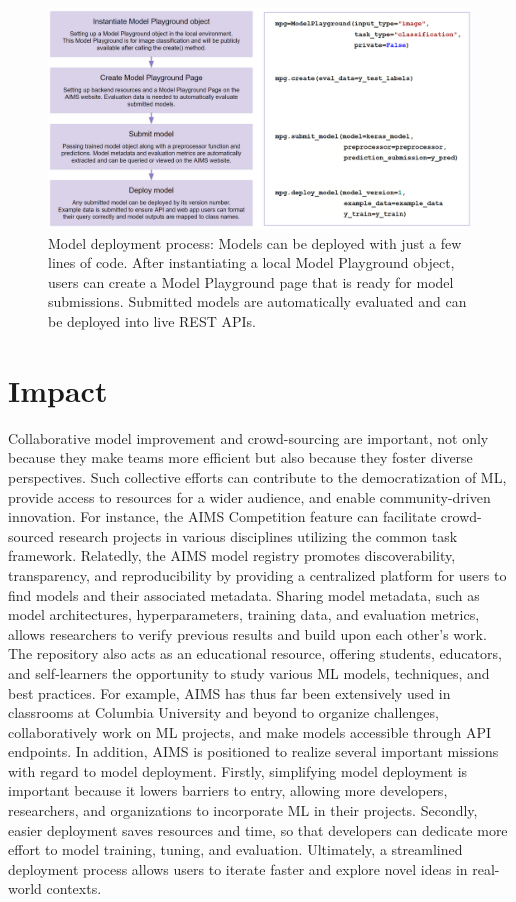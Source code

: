 \begin{figure}
  \centering
  \includegraphics[width=1\textwidth]{figures/fig_aims_code_new.png}
  \caption{Model deployment process: Models can be deployed with just a few lines of code. After instantiating a local Model Playground object, users can create a Model Playground page that is ready for model submissions. Submitted models are automatically evaluated and can be deployed into live REST APIs.}
  \label{fig:fig_code_example}
\end{figure}

\section{Impact}
Collaborative model improvement and crowd-sourcing are important, not only because they make teams more efficient but also because they foster diverse perspectives. Such collective efforts can contribute to the democratization of ML, provide access to resources for a wider audience, and enable community-driven innovation. For instance, the AIMS Competition feature can facilitate crowd-sourced research projects in various disciplines utilizing the common task framework. Relatedly, the AIMS model registry promotes discoverability, transparency, and reproducibility by providing a centralized platform for users to find models and their associated metadata. Sharing model metadata, such as model architectures, hyperparameters, training data, and evaluation metrics, allows researchers to verify previous results and build upon each other's work. The repository also acts as an educational resource, offering students, educators, and self-learners the opportunity to study various ML models, techniques, and best practices. For example, AIMS has thus far been extensively used in classrooms at Columbia University and beyond to organize challenges, collaboratively work on ML projects, and make models accessible through API endpoints. In addition, AIMS is positioned to realize several important missions with regard to model deployment. Firstly, simplifying model deployment is important because it lowers barriers to entry, allowing more developers, researchers, and organizations to incorporate ML in their projects. Secondly, easier deployment saves resources and time, so that developers can dedicate more effort to model training, tuning, and evaluation. Ultimately, a streamlined deployment process allows users to iterate faster and explore novel ideas in real-world contexts.


